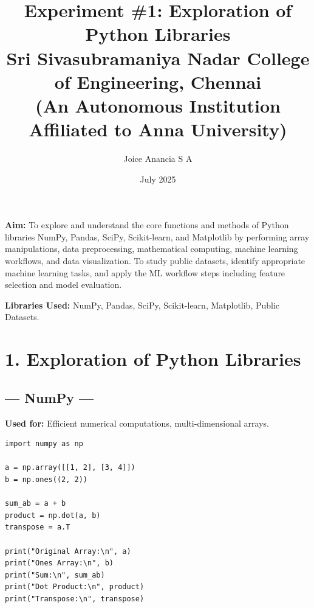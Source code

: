 \documentclass[11pt]{article}
\title{
    \textbf{Experiment \#1: Exploration of Python Libraries} \\
    \large Sri Sivasubramaniya Nadar College of Engineering, Chennai \\
    \normalsize (An Autonomous Institution Affiliated to Anna University)
}
\author{Joice Anancia S A}
\date{July 2025}
\begin{document}
\maketitle

\begin{table}[H]
\renewcommand{\arraystretch}{1.5}
\end{table}

\noindent
\textbf{Aim:} To explore and understand the core functions and methods of Python libraries NumPy, Pandas, SciPy, Scikit-learn, and Matplotlib by performing array manipulations, data preprocessing, mathematical computing, machine learning workflows, and data visualization. To study public datasets, identify appropriate machine learning tasks, and apply the ML workflow steps including feature selection and model evaluation.

\vspace{0.3cm}
\noindent
\textbf{Libraries Used:} NumPy, Pandas, SciPy, Scikit-learn, Matplotlib, Public Datasets.

\vspace{0.5cm}
\section*{1. Exploration of Python Libraries}

\subsection*{--- NumPy ---}
\textbf{Used for:} Efficient numerical computations, multi-dimensional arrays.
\begin{lstlisting}
import numpy as np

a = np.array([[1, 2], [3, 4]])
b = np.ones((2, 2))

sum_ab = a + b
product = np.dot(a, b)
transpose = a.T

print("Original Array:\n", a)
print("Ones Array:\n", b)
print("Sum:\n", sum_ab)
print("Dot Product:\n", product)
print("Transpose:\n", transpose)
\end{lstlisting}
\end{document}
